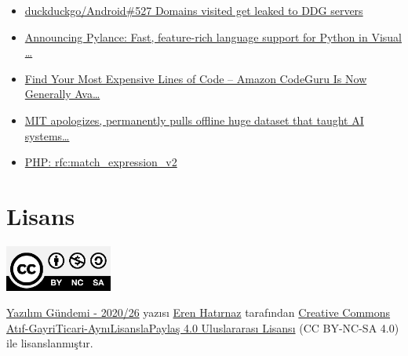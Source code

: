 \documentclass[11pt]{article}
\begin{document}
\begin{itemize}
\item \href{https://github.com/duckduckgo/Android/issues/527}{duckduckgo/Android\#527 Domains visited get leaked to DDG servers}
\item \href{https://devblogs.microsoft.com/python/announcing-pylance-fast-feature-rich-language-support-for-python-in-visual-studio-code/}{Announcing Pylance: Fast, feature-rich language support for Python in Visual \ldots{}}
\item \href{https://aws.amazon.com/tr/blogs/aws/find-your-most-expensive-lines-of-code-amazon-codeguru-is-now-generally-available/}{Find Your Most Expensive Lines of Code – Amazon CodeGuru Is Now Generally Ava\ldots{}}
\item \href{https://www.theregister.com/2020/07/01/mit\_dataset\_removed/}{MIT apologizes, permanently pulls offline huge dataset that taught AI systems\ldots{}}
\item \href{https://wiki.php.net/rfc/match\_expression\_v2}{PHP: rfc:match\_expression\_v2}
\end{itemize}
\section*{Lisans}
\label{sec:org287ef85}
\begin{center}
\begin{center}
\includegraphics[height=1.5cm]{../../../img/CC_BY-NC-SA_4.0.png}
\end{center}

\href{yazilim-gundemi-2020-26.pdf}{Yazılım Gündemi - 2020/26} yazısı \href{https://erenhatirnaz.github.io}{Eren Hatırnaz} tarafından \href{http://creativecommons.org/licenses/by-nc-sa/4.0/}{Creative Commons
Atıf-GayriTicari-AynıLisanslaPaylaş 4.0 Uluslararası Lisansı} (CC BY-NC-SA 4.0)
ile lisanslanmıştır.
\end{center}
\end{document}
